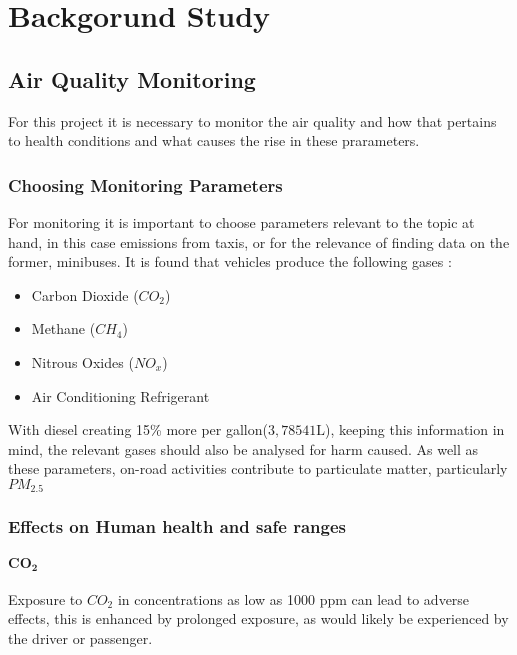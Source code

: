 \chapter{Backgorund Study}

\section{Air Quality Monitoring}
For this project it is necessary to monitor the air quality and how that pertains to health conditions and what causes the rise in these prarameters.
\subsection{Choosing Monitoring Parameters}
For monitoring it is important to choose parameters relevant to the topic at hand, in this case emissions from taxis, or for the relevance of finding data on the former, minibuses. It is found that vehicles produce the following gases\cite{gasfromvehicles}  :

\begin{itemize}
	\item Carbon Dioxide ($CO_2$)
	\item Methane ($CH_4$)
	\item Nitrous Oxides ($NO_x$)
	\item Air Conditioning Refrigerant
\end{itemize}

\noindent With diesel creating 15\% more per gallon($3,78541\si{\liter}$), keeping this information in mind, the relevant gases should also be analysed for harm caused.
\noindent
As well as these parameters, on-road activities contribute to particulate matter, particularly $PM_{2.5}$ \cite{particulatematter}


\subsection{Effects on Human health and safe ranges}

\subsubsection{$\mathbf{CO_2}$}
Exposure to $CO_2$ in concentrations as low as 1000 ppm can lead to adverse effects\cite{healthrisksco2}, this is enhanced by prolonged exposure, as would likely be experienced by the driver or passenger. 


\pagebreak

